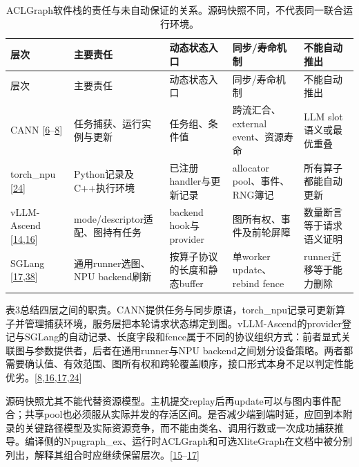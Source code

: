 \documentclass[
  UTF8,
  zihao=5]{ctexart}
\begin{document}
\begin{longtable}[]{@{}
  >{\raggedright\arraybackslash}p{}
  >{\raggedright\arraybackslash}p{}
  >{\raggedright\arraybackslash}p{}
  >{\raggedright\arraybackslash}p{}
  >{\raggedright\arraybackslash}p{}@{}}
\caption{ACLGraph软件栈的责任与未自动保证的关系。源码快照不同，不代表同一联合运行环境。}\tabularnewline
\toprule
层次 & 主要责任 & 动态状态入口 & 同步/寿命机制 & 不能自动推出 \\
\midrule
\endfirsthead
\toprule
层次 & 主要责任 & 动态状态入口 & 同步/寿命机制 & 不能自动推出 \\
\midrule
\endhead
CANN
{[}\protect\hyperlink{ref-cann910single}{6}--\protect\hyperlink{ref-cann910update}{8}{]}
& 任务捕获、运行实例与更新 & 任务组、条件值 & 跨流汇合、external
event、资源寿命 & LLM slot语义或最优重叠 \\
torch\_npu {[}\protect\hyperlink{ref-torchnpu2026graphs}{24}{]} &
Python记录及C++执行环境 & 已注册handler与更新记录 & allocator
pool、事件、RNG簿记 & 所有算子都能自动更新 \\
vLLM-Ascend
{[}\protect\hyperlink{ref-vllmascenddesign}{14},\protect\hyperlink{ref-vllmascend2026impl}{16}{]}
& mode/descriptor适配、图持有任务 & backend hook与provider &
图所有权、事件及前轮屏障 & 数量断言等于请求语义证明 \\
SGLang
{[}\protect\hyperlink{ref-sglang2026impl}{17},\protect\hyperlink{ref-sglang2026refactor}{38}{]}
& 通用runner选图、NPU backend刷新 & 按算子协议的长度和静态buffer &
单worker update、rebind fence & runner迁移等于能力删除 \\
\bottomrule
\end{longtable}

表3总结四层之间的职责。CANN提供任务与同步原语，torch\_npu记录可更新算子并管理捕获环境，服务层把本轮请求状态绑定到图。vLLM-Ascend的provider登记与SGLang的自动记录、长度字段和fence属于不同的协议组织方式：前者显式关联图与参数提供者，后者在通用runner与NPU
backend之间划分设备策略。两者都需要确认值、有效范围、图所有权和跨轮覆盖顺序，接口形式本身不足以判定性能优劣。{[}\protect\hyperlink{ref-cann910update}{8},\protect\hyperlink{ref-vllmascend2026impl}{16},\protect\hyperlink{ref-sglang2026impl}{17},\protect\hyperlink{ref-torchnpu2026graphs}{24}{]}

源码快照尤其不能代替资源模型。主机提交replay后再update可以与图内事件配合；共享pool也必须服从实际并发的存活区间。是否减少端到端时延，应回到本附录的关键路径模型及实际资源竞争，而不能由类名、调用行数或一次成功捕获推导。编译侧的Npugraph\_ex、运行时ACLGraph和可选XliteGraph在文档中被分别列出，解释其组合时应继续保留层次。{[}\protect\hyperlink{ref-vllmascendmode}{15}--\protect\hyperlink{ref-sglang2026impl}{17}{]}
\end{document}
